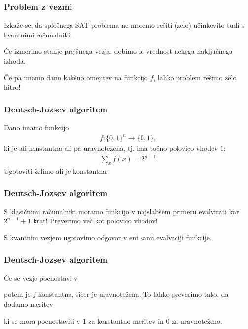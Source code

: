 \documentclass[10pt]{beamer}
\begin{document}
\begin{frame}
  \frametitle{Problem z vezmi}
  Izkaže se, da splošnega SAT problema ne moremo rešiti (zelo) učinkovito tudi s kvantnimi računalniki.

  Če izmerimo stanje prejšnega vezja, dobimo le vrednost nekega naključnega izhoda.

  Če pa imamo dano kakšno omejitev na funkcijo \(f\), lahko problem rešimo zelo hitro!
\end{frame}
\begin{frame}
  \frametitle{Deutsch-Jozsev algoritem}
  Dano imamo funkcijo
  \begin{align*}
    f: \{0,1\}^n\to \{0,1\},
  \end{align*}
  ki je ali konstantna ali pa uravnotežena, tj. ima točno polovico vhodov \(1\):
  \begin{align*}
    \sum_x f(x) = 2^{n-1}
  \end{align*}
  Ugotoviti želimo ali je konstantna.
\end{frame}
\begin{frame}
  \frametitle{Deutsch-Jozsev algoritem}
  S klasičnimi računalniki moramo funkcijo v najslabšem primeru evalvirati kar \(2^{n-1}+1\) krat! Preverimo več kot polovico vhodov!

  S kvantnim vezjem ugotovimo odgovor v eni sami evalvaciji funkcije.
  \begin{center}
  \end{center}
\end{frame}
\begin{frame}
  \frametitle{Deutsch-Jozsev algoritem}
  Če se vezje poenostavi v
  \begin{center}
  \end{center}
  potem je \(f\) konstantna, sicer je uravnotežena. To lahko preverimo tako, da dodamo meritev
  \begin{center}
  \end{center}
  ki se mora poenostaviti v \(1\) za konstantno meritev in \(0\) za uravnoteženo.
\end{frame}
\end{document}
